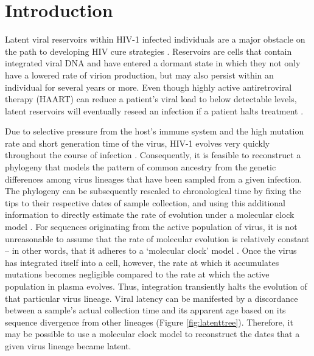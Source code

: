 \section * {Introduction} \label{sec:intro}

Latent viral reservoirs within HIV-1 infected individuals are a major obstacle on the path to developing HIV cure strategies \citep{Pace11}. 
Reservoirs are cells that contain integrated viral DNA and have entered a dormant state in which they not only have a lowered rate of virion production, but may also persist within an individual for several years or more.
Even though highly active antiretroviral therapy (HAART) can reduce a patient's viral load to below detectable levels, latent reservoirs will eventually reseed an infection if a patient halts treatment \citep{Joos08, Pomerantz03, Richman09}.


Due to selective pressure from the host's immune system and the high mutation rate and short generation time of the virus, HIV-1 evolves very quickly throughout the course of infection \citep{Alizon13, Shankarappa99, Rambaut04}. 
Consequently, it is feasible to reconstruct a phylogeny that models the pattern of common ancestry from the genetic differences among virus lineages that have been sampled from a given infection. 
The phylogeny can be subsequently rescaled to chronological time by fixing the tips to their respective dates of sample collection, and using this additional information to directly estimate the rate of evolution under a molecular clock model \citep{Rodrigo99}.
For sequences originating from the active population of virus, it is not unreasonable to assume that the rate of molecular evolution is relatively constant -- in other words, that it adheres to a `molecular clock' model \citep{Leitner99, Kuhner95, Korber00}. 
Once the virus has integrated itself into a cell, however, the rate at which it accumulates mutations becomes negligible compared to the rate at which the active population in plasma evolves. 
Thus, integration transiently halts the evolution of that particular virus lineage. 
Viral latency can be manifested by a discordance between a sample's actual collection time and its apparent age based on its sequence divergence from other lineages (Figure \ref{fig:latenttree}). 
Therefore, it may be possible to use a molecular clock model to reconstruct the dates that a given virus lineage became latent.

